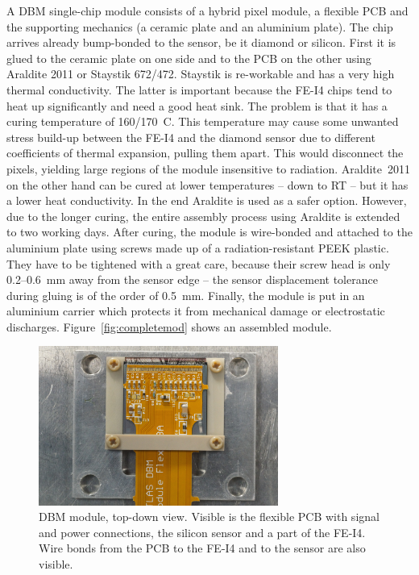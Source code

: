 A DBM single-chip module consists of a hybrid pixel module, a flexible PCB and the supporting mechanics (a ceramic plate and an aluminium plate). The chip arrives already bump-bonded to the sensor, be it diamond or silicon. First it is glued to the ceramic plate on one side and to the PCB on the other using Araldite 2011 or Staystik 672/472. 
Staystik is re-workable and has a very high thermal conductivity. The latter is important because the FE-I4 chips tend to heat up significantly and need a good heat sink. The problem is that it has a curing temperature of 160/170~\textdegree C. This temperature may cause some unwanted stress build-up between the FE-I4 and the diamond sensor due to different coefficients of thermal expansion, pulling them apart. This would disconnect the pixels, yielding large regions of the module insensitive to radiation. Araldite~2011 on the other hand can be cured at lower temperatures -- down to RT -- but it has a lower heat conductivity. In the end Araldite is used as a safer option. However, due to the longer curing, the entire assembly process using Araldite is extended to two working days. After curing, the module is wire-bonded and attached to the aluminium plate using screws made up of a radiation-resistant PEEK plastic. They have to be tightened with a great care, because their screw head is only 0.2--0.6~mm away from the sensor edge -- the sensor displacement tolerance during gluing is of the order of 0.5~mm. Finally, the module is put in an aluminium carrier which protects it from mechanical damage or electrostatic discharges. Figure~\ref{fig:completemod} shows an assembled module.


\begin{figure}[!t]
\centering
\includegraphics[width=0.7\textwidth]{04_charge_monitoring/pics/mod1}
\caption{DBM module, top-down view. Visible is the flexible PCB with signal and power connections, the silicon sensor and a part of the FE-I4. Wire bonds from the PCB to the FE-I4 and to the sensor are also visible.}
\label{fig:completedmod}
\end{figure}



